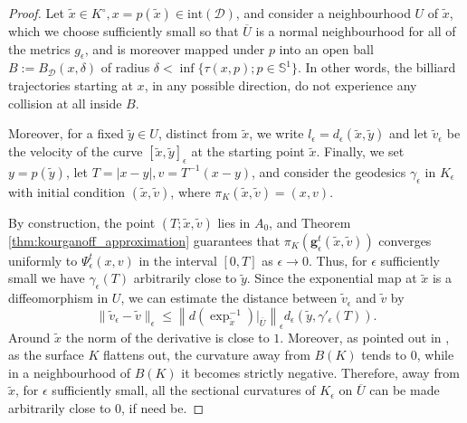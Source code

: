 \documentclass[reqno,11pt]{amsart}
\begin{document}
\begin{proof}
    Let \( \widetilde x \in K^\circ, x = p(\widetilde x) \in \mathrm{int}(\mathcal{D}) \), and consider a neighbourhood \( U \) of \( \widetilde x \), which we choose sufficiently small so that \( \overline U \) is a normal neighbourhood for all of the metrics \( g_\epsilon \), and is moreover mapped under \( p \) into an open ball \( B := B_{\mathcal{D}}(x, \delta) \) of radius \( \delta < \inf\{\tau(x, p); p \in \mathbb{S}^1\}. \)
    In other words, the billiard trajectories starting at \( x \), in any possible direction, do not experience any collision at all inside \( B \).
    \par Moreover, for a fixed \( \widetilde y \in U \), distinct from \( \widetilde x \), we write \( l_\epsilon = d_\epsilon(\widetilde x, \widetilde y) \) and let
    \( \widetilde{v}_\epsilon \) be the velocity of the curve \( [\widetilde x,\widetilde y]_\epsilon \) at the starting point \( \widetilde x \).
    Finally, we set \( y = p(\widetilde y) \), let \( T = |x-y|, v = T^{-1}(x-y) \), and consider the geodesics \( \gamma_\epsilon \) in \( K_\epsilon \) with initial condition \( (\widetilde x,\widetilde v) \), where \( \pi_K(\widetilde x, \widetilde v) = (x, v) \).
    \par By construction, the point \( (T; \widetilde x,\widetilde v) \) lies in \( A_0 \), and Theorem \ref{thm:kourganoff_approximation} guarantees that 
    \( \pi_K(\mathbf{g}_\epsilon^t(\widetilde x,\widetilde v)) \) converges uniformly to \( \Psi_\epsilon^t(x, v) \) in the interval \( [0, T] \) as \( \epsilon \to 0 \). 
    Thus, for \( \epsilon \) sufficiently small we have \( \gamma_\epsilon(T) \) arbitrarily close to \( \widetilde y \). 
    Since the exponential map at \( \widetilde x \) is a diffeomorphism in \( U \), we can estimate the distance between \( \widetilde v_\epsilon \) and \( \widetilde v \) by
    \[
        \|\widetilde v_\epsilon - \widetilde v\|_\epsilon \leq \left\|d(\exp_{\widetilde x}^{-1})\rvert_{\overline U}\right\|_\epsilon d_\epsilon(\widetilde y, \gamma'_\epsilon(T)).
    \]
    Around \( \widetilde x \) the norm of the derivative is close to \( 1 \).
    Moreover, as pointed out in \cite{kourganoff_anosov_2016}, as the surface \( K \) flattens out, the curvature away from \( B(K) \) tends to \( 0 \), while in a neighbourhood of \( B(K) \) it becomes strictly negative.
    Therefore, away from \( \widetilde x \), for \( \epsilon \) sufficiently small, all the sectional curvatures of \( K_\epsilon \) on \( \overline U \) can be made arbitrarily close to \( 0 \), if need be. 

\end{proof}
\end{document}
